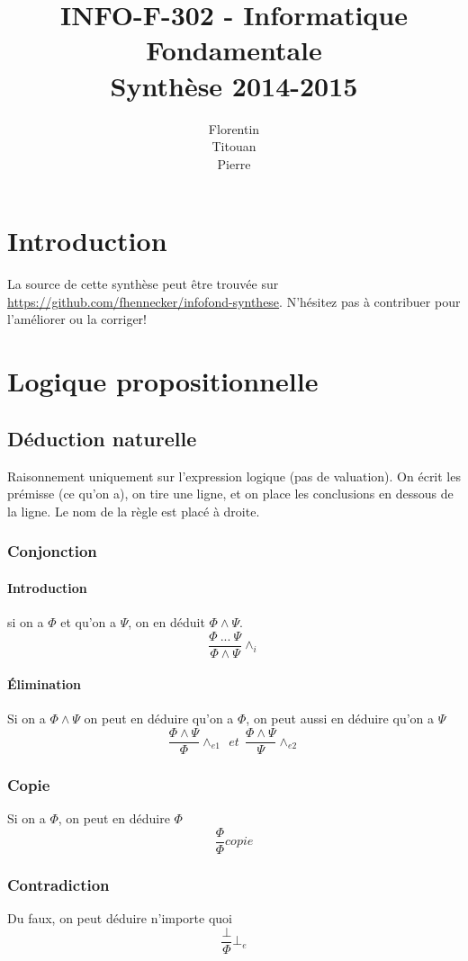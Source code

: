 \documentclass[a4paper]{article}
\title{
    INFO-F-302 - Informatique Fondamentale\\
    \small Synthèse 2014-2015
}
\author{Florentin \bsc{Hennecker}\\Titouan \bsc{Christophe}\\ Pierre \bsc{Gérard}}
\date{}
\begin{document}
\maketitle
\tableofcontents

\section{Introduction}
La source de cette synthèse peut être trouvée sur \url{https://github.com/fhennecker/infofond-synthese}. N'hésitez pas à contribuer pour l'améliorer ou la corriger!

\section{Logique propositionnelle}

  \subsection{Déduction naturelle}
  Raisonnement uniquement sur l'expression logique (pas de valuation).
  On écrit les prémisse (ce qu'on a), on tire une ligne, et on place les conclusions
  en dessous de la ligne. Le nom de la règle est placé à droite.
  
  \subsubsection{Conjonction}
  \paragraph{Introduction} si on a $\Phi$ et qu'on a $\Psi$,
  on en déduit $\Phi\land\Psi$.
  $$\frac{\Phi~...~\Psi}{\Phi \land \Psi}\land_{i}$$

  \paragraph{\'Elimination} Si on a $\Phi\land\Psi$ on peut en
  déduire qu'on a $\Phi$, on peut aussi en déduire qu'on a $\Psi$
  $$\frac{\Phi \land \Psi}{\Phi}\land_{e1} ~~ et ~~ \frac{\Phi \land \Psi}{\Psi}\land_{e2}$$

  \subsubsection{Copie} Si on a $\Phi$, on peut en déduire $\Phi$
  $$\frac{\Phi}{\Phi}copie $$

  \subsubsection{Contradiction}Du faux, on peut déduire n'importe quoi
  $$ \frac{\bot}{\Phi}\bot_{e} $$
\end{document}
